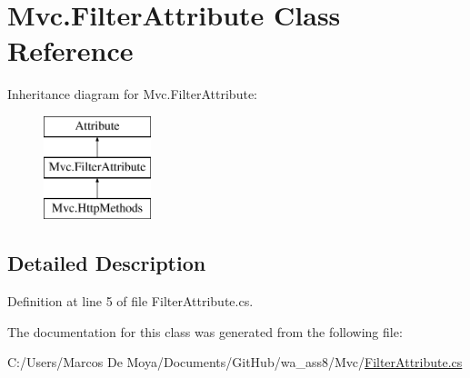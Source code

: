 \hypertarget{class_mvc_1_1_filter_attribute}{}\section{Mvc.\+Filter\+Attribute Class Reference}
\label{class_mvc_1_1_filter_attribute}
Inheritance diagram for Mvc.\+Filter\+Attribute\+:\begin{figure}[H]
\begin{center}
\leavevmode
\includegraphics[height=3.000000cm]{class_mvc_1_1_filter_attribute}
\end{center}
\end{figure}


\subsection{Detailed Description}


Definition at line 5 of file Filter\+Attribute.\+cs.



The documentation for this class was generated from the following file\+:\begin{DoxyCompactItemize}
\item 
C\+:/\+Users/\+Marcos De Moya/\+Documents/\+Git\+Hub/wa\+\_\+ass8/\+Mvc/\hyperlink{_filter_attribute_8cs}{Filter\+Attribute.\+cs}\end{DoxyCompactItemize}
